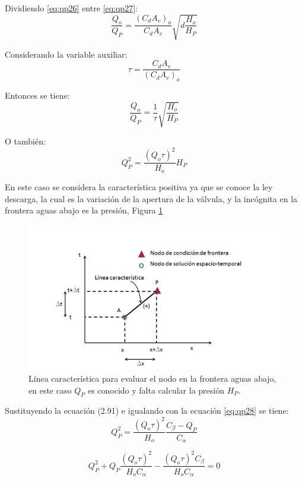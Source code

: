 \documentclass[letterpaper]{report}
\begin{document}
Dividiendo \ref{eq:qp26} entre \ref{eq:qp27}:
\begin{equation*}
	\dfrac{Q_o}{Q_P}=\dfrac{(C_dA_v)_o}{C_dA_v}\sqrt{d\frac{H_o}{H_P}}
\end{equation*}

Considerando la variable auxiliar:
\begin{equation*}
	\tau=\dfrac{C_dA_v}{(C_dA_v)_o}
\end{equation*}

Entonces se tiene:
\begin{equation*}
	\dfrac{Q_o}{Q_P}=\dfrac{1}{\tau}\sqrt{\dfrac{H_o}{H_P}}
\end{equation*}

O también:
\begin{equation}
	Q_P^2=\dfrac{(Q_o\tau)^2}{H_o}H_P
\label{eq:qp28}
\end{equation}

En este caso se considera la característica positiva ya que se conoce la ley descarga, la cual es la variación de la apertura de la válvula, y la incógnita en la frontera aguas abajo es la presión, Figura \ref{fig:fig28}
 \begin{figure}[H]
	\centering
	\includegraphics[width=1.0\linewidth]{figuras/fig28}
	\caption{Línea característica para evaluar el nodo en la frontera aguas abajo, en este caso $Q_P$ es conocido y falta calcular la presión $H_P$.}
	\label{fig:fig28}
\end{figure}

Sustituyendo la ecuación (2.91) e igualando con la ecuación \ref{eq:qp28} se tiene:
\begin{equation*}
	Q_P^2=\dfrac{(Q_o\tau)^2}{H_o}\frac{C_\beta-Q_P}{C_\alpha}
\end{equation*}

\begin{equation*}
	Q_P^2+Q_P\dfrac{(Q_o\tau)^2}{H_oC_\alpha}-\dfrac{\left(Q_o\tau\right)^2C_\beta}{H_oC_\alpha}=0
\end{equation*}
\end{document}
